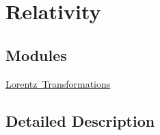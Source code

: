 \hypertarget{group___e_g_x_phys-_relativity}{}\section{Relativity}
\label{group___e_g_x_phys-_relativity}
\subsection*{Modules}
\begin{DoxyCompactItemize}
\item 
\mbox{\hyperlink{group___e_g_x_phys-_lorentz_transformations}{Lorentz Transformations}}
\end{DoxyCompactItemize}


\subsection{Detailed Description}
